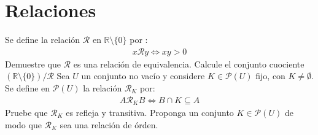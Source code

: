 \documentclass[dcc]{fcfmcourse}
\begin{document}
\section*{Relaciones}
\begin{problems}
\problem Se define la relación $\mathcal{R}$ en $\mathbb{R} \setminus \{0\}$ por :
\begin{align*}
    x\mathcal{R}y \Leftrightarrow xy>0
\end{align*}
Demuestre que $\mathcal{R}$ es una relación de equivalencia. Calcule el conjunto cuociente $(\mathbb{R} \setminus \{0\})/\mathcal{R}$
\problem Sea $U$ un conjunto no vacío y considere $K \in \mathcal{P}(U)$ fijo, con $K \not = \emptyset$. Se define en $\mathcal{P}(U)$ la relación $\mathcal{R}_{K}$ por:
\begin{align*}
    A\mathcal{R}_{K}B \Leftrightarrow B \cap K \subseteq A
\end{align*}
Pruebe  que $\mathcal{R}_{K}$ es refleja y transitiva. Proponga un conjunto $K \in \mathcal{P}(U)$ de modo que $\mathcal{R}_{K}$ sea una relación de órden.
\end{problems}
\newpage
\end{document}
